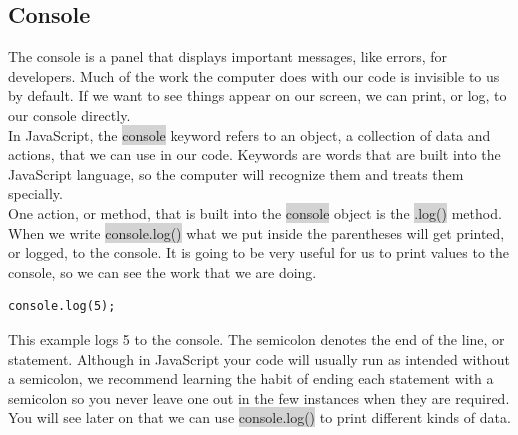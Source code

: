 \documentclass[11pt]{article}
\begin{document}
\subsection{Console}
The console is a panel that displays important messages, like errors, for developers. Much of the work the computer does with our code is invisible to us by default. If we want to see things appear on our screen, we can print, or log, to our console directly. \\
\newline
In JavaScript, the \colorbox{lightgray}{console} keyword refers to an object, a collection of data and actions, that we can use in our code. Keywords are words that are built into the JavaScript language, so the computer will recognize them and treats them specially. \\
\newline
One action, or method, that is built into the \colorbox{lightgray}{console} object is the \colorbox{lightgray}{.log()} method. When we write \colorbox{lightgray}{console.log()} what we put inside the parentheses will get printed, or logged, to the console. It is going to be very useful for us to print values to the console, so we can see the work that we are doing.
\begin{lstlisting}
console.log(5); 
\end{lstlisting}
This example logs 5 to the console. The semicolon denotes the end of the line, or statement. Although in JavaScript your code will usually run as intended without a semicolon, we recommend learning the habit of ending each statement with a semicolon so you never leave one out in the few instances when they are required. \\
\newline
You will see later on that we can use \colorbox{lightgray}{console.log()} to print different kinds of data.
\end{document}
